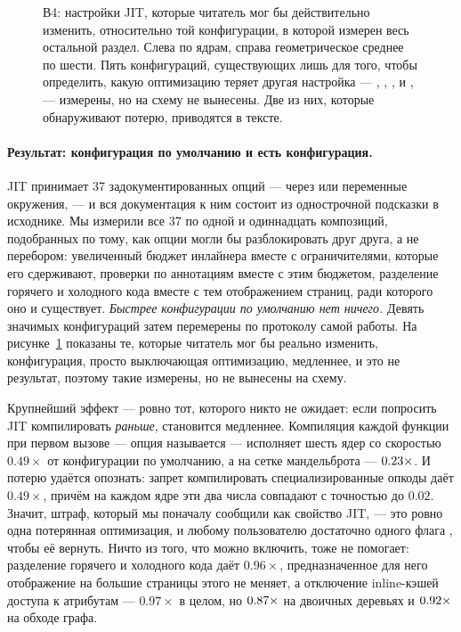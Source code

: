 \begin{figure}[t]
  \centering
  \caption{В4: настройки JIT, которые читатель мог бы действительно изменить, относительно той
    конфигурации, в которой измерен весь остальной раздел. Слева по ядрам, справа геометрическое
    среднее по шести. Пять конфигураций, существующих лишь для того, чтобы определить, какую
    оптимизацию теряет другая настройка --- , ,
    ,  и , ---
    измерены, но на схему не вынесены. Две из них, которые обнаруживают потерю, приводятся
    в тексте.}
  \label{fig:jitopts}
\end{figure}

\paragraph{Результат: конфигурация по умолчанию и есть конфигурация.} JIT принимает 37
задокументированных опций --- через  или переменные окружения, --- и
вся документация к ним состоит из однострочной подсказки в исходнике. Мы измерили все 37 по
одной и одиннадцать композиций, подобранных по тому, как опции могли бы разблокировать друг
друга, а не перебором: увеличенный бюджет инлайнера вместе с ограничителями, которые его
сдерживают, проверки по аннотациям вместе с этим бюджетом, разделение горячего и холодного кода
вместе с тем отображением страниц, ради которого оно и существует. \emph{Быстрее конфигурации по умолчанию нет
ничего.} Девять значимых конфигураций затем перемерены по протоколу самой работы.
На рисунке~\ref{fig:jitopts} показаны те, которые читатель мог бы
реально изменить, конфигурация, просто выключающая оптимизацию, медленнее, и это не результат,
поэтому такие измерены, но не вынесены на схему.

Крупнейший эффект --- ровно тот, которого никто не ожидает: если попросить JIT компилировать
\emph{раньше}, становится медленнее. Компиляция каждой функции при первом вызове --- опция
называется  --- исполняет шесть ядер со скоростью $0.49\times$ от конфигурации по
умолчанию, а на сетке мандельброта --- $\meas{ratio:b6_cinderx-jitopt_default:mandelbrot/jitopt_default|b6_cinderx-jitopt_compile_at_first_call:mandelbrot/jitopt_compile_at_first_call}{0.23}\times$. И потерю удаётся опознать: запрет
компилировать специализированные опкоды даёт $0.49\times$, причём на каждом ядре эти два числа
совпадают с точностью до $0.02$. Значит, штраф, который мы поначалу сообщили как свойство JIT,
--- это ровно одна потерянная оптимизация, и любому пользователю достаточно одного флага
, чтобы её вернуть.
Ничто из того, что можно включить, тоже не помогает: разделение горячего и холодного кода даёт
$0.96\times$, предназначенное для него отображение на большие страницы этого не меняет, а
отключение inline-кэшей доступа к атрибутам --- $0.97\times$ в целом, но $\meas{ratio:b6_cinderx-jitopt_default:binarytrees/jitopt_default|b6_cinderx-jitopt_no_attr_caches:binarytrees/jitopt_no_attr_caches}{0.87}\times$ на
двоичных деревьях и $\meas{ratio:b6_cinderx-jitopt_default:bfs/jitopt_default|b6_cinderx-jitopt_no_attr_caches:bfs/jitopt_no_attr_caches}{0.92}\times$ на обходе графа.


